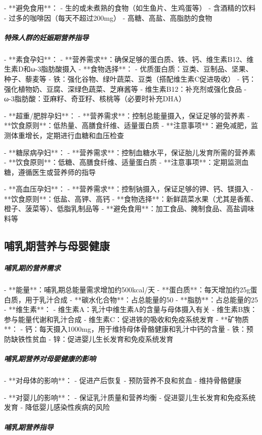 \begin{enumerate}
- **避免食用**：
  - 生的或未煮熟的食物（如生鱼片、生鸡蛋等）
  - 含酒精的饮料
  - 过多的咖啡因（每天不超过200mg）
  - 高糖、高盐、高脂肪的食物

\subparagraph{特殊人群的妊娠期营养指导}

- **素食孕妇**：
  - **营养需求**：确保足够的蛋白质、铁、钙、维生素B12、维生素D和ω-3脂肪酸摄入
  - **食物选择**：
    - 优质蛋白质：豆类、豆制品、坚果、种子、藜麦等
    - 铁：强化谷物、绿叶蔬菜、豆类（搭配维生素C促进吸收）
    - 钙：强化植物奶、豆腐、深绿色蔬菜、芝麻酱等
    - 维生素B12：补充剂或强化食品
    - ω-3脂肪酸：亚麻籽、奇亚籽、核桃等（必要时补充DHA）

- **超重/肥胖孕妇**：
  - **营养需求**：控制总能量摄入，保证足够的营养素
  - **饮食原则**：低热量、高膳食纤维、适量蛋白质
  - **注意事项**：避免减肥，监测体重增长，定期进行血糖和血压检查

- **糖尿病孕妇**：
  - **营养需求**：控制血糖水平，保证胎儿发育所需的营养素
  - **饮食原则**：低糖、高膳食纤维、适量蛋白质
  - **注意事项**：定期监测血糖，遵循医生或营养师的指导

- **高血压孕妇**：
  - **营养需求**：控制钠摄入，保证足够的钾、钙、镁摄入
  - **饮食原则**：低盐、高钾、高钙
  - **食物选择**：新鲜蔬菜水果（尤其是香蕉、橙子、菠菜等）、低脂乳制品等
  - **避免食用**：加工食品、腌制食品、高盐调味料等

\subsection{哺乳期营养与母婴健康}

\subparagraph{哺乳期的营养需求}

- **能量**：哺乳期总能量需求增加约500kcal/天
- **蛋白质**：每天增加约25g蛋白质，用于乳汁合成
- **碳水化合物**：占总能量的50%
- **脂肪**：占总能量的25%
- **维生素**：
  - 维生素A：乳汁中维生素A的含量与母体摄入有关
  - 维生素B族：参与能量代谢和乳汁合成
  - 维生素C：促进铁的吸收和免疫系统发育
- **矿物质**：
  - 钙：每天摄入1000mg，用于维持母体骨骼健康和乳汁中钙的含量
  - 铁：预防缺铁性贫血
  - 锌：促进婴儿生长发育和免疫系统发育

\subparagraph{哺乳期营养对母婴健康的影响}

- **对母体的影响**：
  - 促进产后恢复
  - 预防营养不良和贫血
  - 维持骨骼健康

- **对婴儿的影响**：
  - 保证乳汁质量和营养均衡
  - 促进婴儿生长发育和免疫系统发育
  - 降低婴儿感染性疾病的风险

\subparagraph{哺乳期营养指导}


\end{enumerate}
